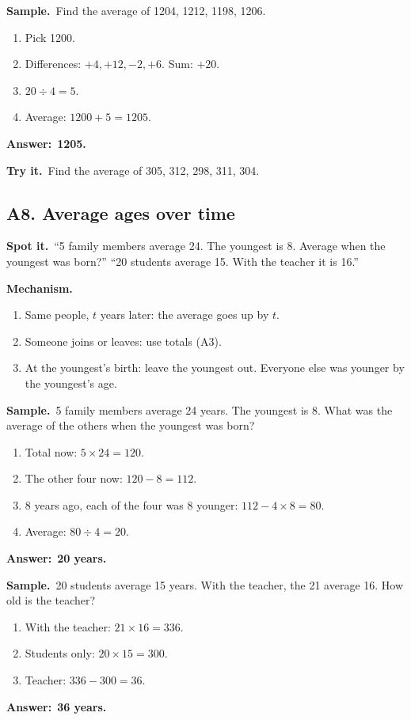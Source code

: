 \documentclass[11pt,a4paper]{article}
\let\oldsubsection\subsection
\renewcommand{\subsection}{\needspace{9\baselineskip}\oldsubsection}
\newcommand{\spot}{\textbf{\color{ember}Spot it.}\ }
\newcommand{\mech}{\textbf{\color{ember}Mechanism.}\ }
\newif\ifkeepsamp
\newcommand{\ans}[1]{\par\nopagebreak\noindent\textbf{\color{ember}Answer:}\ \textbf{#1}\par}
\newcommand{\samp}{\ifkeepsamp\needspace{4\baselineskip}\fi\textbf{\color{ember}Sample.}\ }
\newcommand{\tryit}[1]{\textbf{\color{ember}Try it.}\ #1}
\begin{document}
\samp Find the average of 1204, 1212, 1198, 1206.
\begin{enumerate}
\item Pick 1200.
\item Differences: $+4, +12, -2, +6$. Sum: $+20$.
\item $20 \div 4 = 5$.
\item Average: $1200 + 5 = 1205$.
\end{enumerate}
\ans{1205.}

\tryit Find the average of 305, 312, 298, 311, 304.

\subsection{A8. Average ages over time}
\spot ``5 family members average 24. The youngest is 8. Average when the youngest was born?'' ``20 students average 15. With the teacher it is 16.''

\mech
\begin{enumerate}
\item Same people, $t$ years later: the average goes up by $t$.
\item Someone joins or leaves: use totals (A3).
\item At the youngest's birth: leave the youngest out. Everyone else was younger by the youngest's age.
\end{enumerate}

\samp 5 family members average 24 years. The youngest is 8. What was the average of the others when the youngest was born?
\begin{enumerate}
\item Total now: $5 \times 24 = 120$.
\item The other four now: $120 - 8 = 112$.
\item 8 years ago, each of the four was 8 younger: $112 - 4 \times 8 = 80$.
\item Average: $80 \div 4 = 20$.
\end{enumerate}
\ans{20 years.}

\samp 20 students average 15 years. With the teacher, the 21 average 16. How old is the teacher?
\begin{enumerate}
\item With the teacher: $21 \times 16 = 336$.
\item Students only: $20 \times 15 = 300$.
\item Teacher: $336 - 300 = 36$.
\end{enumerate}
\ans{36 years.}
\end{document}
